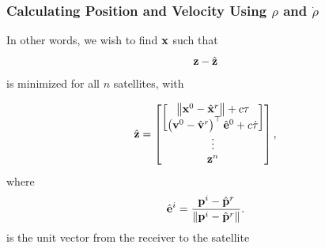 \documentclass{beamer}
\newcommand{\norm}[1]{\left\lVert#1\right\rVert}
\begin{document}
\begin{frame}\frametitle{Calculating Position and Velocity Using $\rho$ and $\dot{\rho}$}
In other words, we wish to find $\mathbf{x}$ such that
\[
\mathbf{z}-\hat{\mathbf{z}}
\]
is minimized for all $n$ satellites, with

\begin{equation}
\hat{\z}=\begin{bmatrix}\begin{bmatrix}\norm{\x^{0}-\hat{\x}^{r}}+c\tau\\
\left(\v^{0}-\hat{\v}^{r}\right)^{\top}\hat{\e}^{0}+c\dot{\tau}
\end{bmatrix}\\
\vdots\\
\z^{n}
\end{bmatrix},\label{eq:pseudorange_opt}
\end{equation}
where
\[
\hat{\e}^{i}=\frac{\p^{i}-\hat{\p}^{r}}{\norm{\p^{i}-\hat{\p}^{r}}}.
\]
is the unit vector from the receiver to the satellite
\end{frame}
\end{document}
